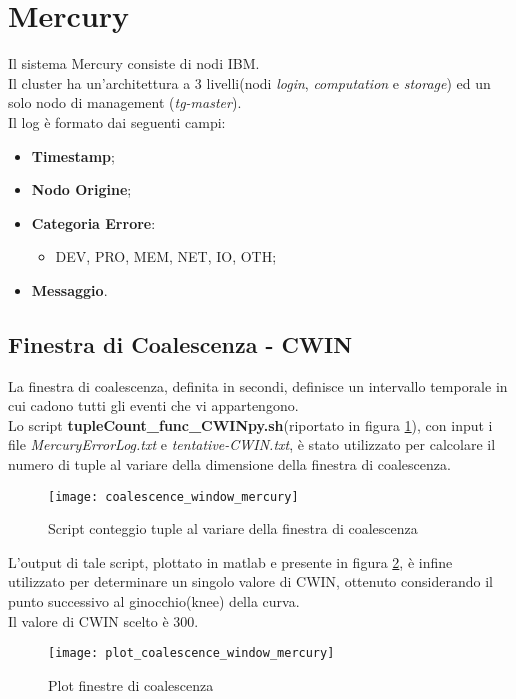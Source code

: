 \clearpage

\section{Mercury}
Il sistema Mercury consiste di nodi IBM.\\
Il cluster ha un'architettura a 3 livelli(nodi \textit{login}, \textit{computation}
e \textit{storage}) ed un solo nodo di management
(\textit{tg-master}).\\
Il log è formato dai seguenti campi:
\begin{itemize}
  \item \textbf{Timestamp};
  \item \textbf{Nodo Origine};
  \item \textbf{Categoria Errore}:
  \begin{itemize}
    \item DEV, PRO, MEM, NET, IO, OTH;
  \end{itemize}
  \item \textbf{Messaggio}.
\end{itemize}

\subsection{Finestra di Coalescenza - CWIN}
La finestra di coalescenza, definita in secondi, definisce un intervallo temporale
in cui cadono tutti gli eventi che vi appartengono.\\
Lo script \textbf{tupleCount\_func\_CWINpy.sh}(riportato in figura \ref{coalescence_window_mercury}), con input i file \textit{MercuryErrorLog.txt}
e \textit{tentative-CWIN.txt}, è stato utilizzato per calcolare il numero di tuple al
variare della dimensione della finestra di coalescenza.\\

\begin{figure}[!htbp]
  \texttt{[image: coalescence\_window\_mercury]}
  \caption{Script conteggio tuple al variare della finestra di coalescenza}
  \label{coalescence_window_mercury}
\end{figure}

\clearpage

L'output di tale script, plottato in matlab e presente in figura \ref{plot_coalescence_window_mercury},
è infine utilizzato per determinare un singolo valore di CWIN, ottenuto
considerando il punto successivo al ginocchio(knee) della curva.\\
Il valore di CWIN scelto è 300.\\
\begin{figure}[!htbp]
  \texttt{[image: plot\_coalescence\_window\_mercury]}
  \caption{Plot finestre di coalescenza}
  \label{plot_coalescence_window_mercury}
\end{figure}

